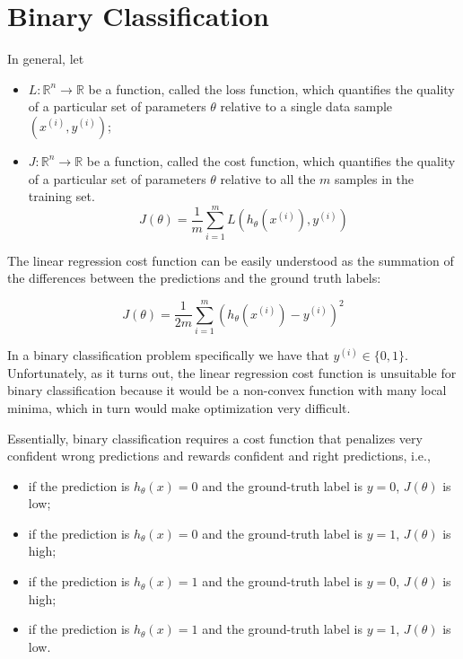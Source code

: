 \section{Binary Classification}

In general, let

\begin{itemize}
    \item $L \colon \mathbb{R}^n \to \mathbb{R}$ be a function, called the loss function, which quantifies the quality of a particular set of parameters $\theta$ relative to a single data sample $(x^{(i)}, y^{(i)})$;
    \item $J \colon \mathbb{R}^n \to \mathbb{R}$ be a function, called the cost function, which quantifies the quality of a particular set of parameters $\theta$ relative to all the $m$ samples in the training set. $$J(\theta) = \frac{1}{m} \sum_{i=1}^{m} L(h_{\theta}(x^{(i)}), y^{(i)})$$
\end{itemize}

The linear regression cost function can be easily understood as the summation of the differences between the predictions and the ground truth labels:

$$
J(\theta) = \frac{1}{2m} \sum_{i=1}^{m} (h_{\theta}(x^{(i)}) - y^{(i)})^2
$$

In a binary classification problem specifically we have that $y^{(i)} \in \{0, 1\}$. Unfortunately, as it turns out, the linear regression cost function is unsuitable for binary classification because it would be a non-convex function with many local minima, which in turn would make optimization very difficult.

Essentially, binary classification requires a cost function that penalizes very confident wrong predictions and rewards confident and right predictions, i.e.,

\begin{itemize}
    \item if the prediction is $h_{\theta}(x) = 0$ and the ground-truth label is $y = 0$, $J(\theta)$ is low;
    \item if the prediction is $h_{\theta}(x) = 0$ and the ground-truth label is $y = 1$, $J(\theta)$ is high;
    \item if the prediction is $h_{\theta}(x) = 1$ and the ground-truth label is $y = 0$, $J(\theta)$ is high;
    \item if the prediction is $h_{\theta}(x) = 1$ and the ground-truth label is $y = 1$, $J(\theta)$ is low.
\end{itemize}

